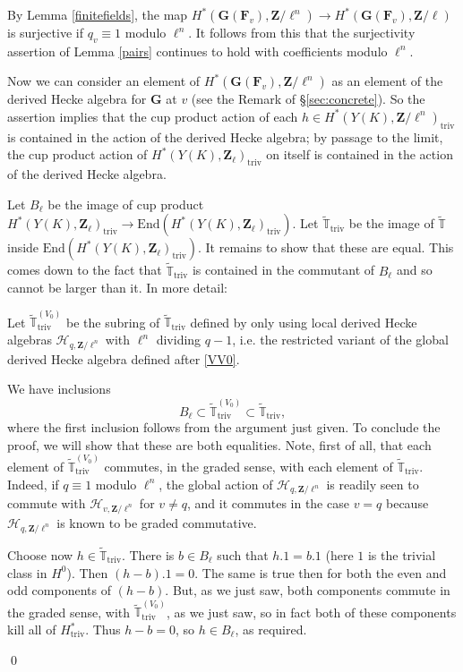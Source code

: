 \documentclass[10pt]{amsart}
\newcommand{\changecolor}{black}
\newcommand{\Z}{\mathbf{Z}}
\newcommand{\triv}{\mathrm{triv}}
\newcommand{\gHecke}{\tilde{\mathbb{T}}}
\newcommand{\End}{\mathrm{End}}
\newcommand{\dHecke}{\mathscr{H}}
\theoremstyle{remark}
\begin{document}
 
 
By  Lemma \ref{finitefields}, the map $H^*(\mathbf{G}(\mathbf{F}_v), \Z/\ell^n) \rightarrow H^*(\mathbf{G}(\mathbf{F}_v), \Z/\ell)$ is surjective 
if $q_v \equiv 1$ modulo $\ell^n$.
It follows from this that the surjectivity assertion of   Lemma \ref{pairs}  continues to hold with coefficients modulo $\ell^n$. 

 Now we can consider an element of $H^*(\mathbf{G}(\mathbf{F}_v), \Z/\ell^n)$
 as an element of the derived Hecke algebra for $\mathbf{G}$ at $v$ (see the Remark of \S \ref{sec:concrete}). 
So the assertion implies that the cup product action of each $h \in H^*(Y(K), \Z/\ell^n)_{\triv}$ is contained
in the action of the derived Hecke algebra; by passage to the limit,
the cup product action of $H^*(Y(K), \Z_{\ell})_{\triv}$ on itself is contained in the action of the derived Hecke algebra. 

 
Let $B_{\ell}$ be the  image of cup product $H^*(Y(K), \Z_{\ell})_{\triv} \rightarrow \End(H^*(Y(K), \Z_{\ell})_{\triv})$. Let
 $\gHecke_{\triv}$ be the image of $\gHecke$ inside $\End(H^*(Y(K), \Z_{\ell})_{\triv})$.
 It remains to show that these are equal. This comes down to the fact that $\gHecke_{\triv}$ is contained in the commutant
 of $B_{\ell}$ and so cannot be larger than it.  In more detail:
 
 {\color{\changecolor} Let $\gHecke_{\triv}^{(V_0)} $ be the subring of $\gHecke_{\triv}$ defined by only using
local derived Hecke algebras $\dHecke_{q, \Z/\ell^n}$ with $\ell^n$ dividing $q-1$, i.e.
the restricted variant of the global derived Hecke algebra defined after \eqref{VV0}. 

We have inclusions
\begin{equation} \label{inclusions BHH} B_{\ell} \subset \gHecke_{\triv}^{(V_0)} \subset \gHecke_{\triv},\end{equation}
where the first inclusion follows from the argument just given.
To conclude the proof, we will show that these are both equalities. 
Note, first of all, that each element of $\gHecke_{\triv}^{(V_0)}$ commutes, in the graded sense, 
with each element of $\gHecke_{\triv}$. Indeed,  if $q \equiv 1$ modulo $\ell^n$,
the global action of $\dHecke_{q, \Z/\ell^n}$ is readily seen to commute with  $\dHecke_{v, \Z/\ell^n}$
for $v \neq q$, and it commutes in the case $v=q$ because $\dHecke_{q, \Z/\ell^n}$ is known to be graded commutative.

Choose now $h \in \gHecke_{\triv}$.  There is $b \in B_{\ell}$ such that $h.1 = b.1$ (here $1$ is the trivial class in $H^0$). 
Then $(h-b). 1 = 0$.  
The same is true then for both the even and odd components of $(h-b)$. 
But, as we just saw, both components commute in the graded sense, with $\gHecke^{(V_0)}_{\triv}$,
as we just saw, so in fact both of these components kill  all of $H^*_{\triv}$.   Thus $h-b= 0$, so
$h \in B_{\ell}$, as required. }
\qed
%
%
%
%
%
%
%
%
%
%
%
%
%
%
%
%
%
%
%
%
%
%
%
%
%
%
%
%
%
%
%
%
%
%
%
%
%
%
%
%
%
%
%
%
%
%
%
%
%
%
%
%
%
 
\end{document}
